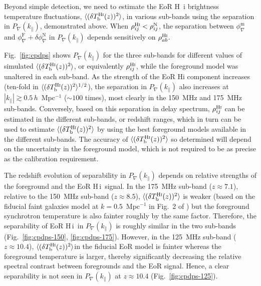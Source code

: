 \documentclass[
reprint,
superscriptaddress,
amsmath,
amssymb,
aps,
prd
]{revtex4-1}
\newcommand{\HI}{H\,{\sc i}}
\begin{document}
Beyond simple detection, we need to estimate the EoR H~{\sc i} brightness temperature fluctuations, $\langle(\delta T_\textrm{b}^\textrm{H{\sc i}}(z))^2\rangle$, in various sub-bands using the separation in $P_\nabla(k_\parallel)$, demonstrated above. When $\rho_{ij}^\textrm{H{\sc i}} < \rho_{ij}^\textrm{N}$, the separation between $\phi_\nabla^\textrm{m}$ and $\phi_\nabla^\textrm{F} + \delta\phi_\nabla^\textrm{N}$ in $P_\nabla(k_\parallel)$ depends sensitively on $\rho_{ab}^\textrm{H{\sc i}}$.

Fig.~\ref{fig:cpdps} shows $P_\nabla(k_\parallel)$ for the three sub-bands for different values of simulated $\langle(\delta T_\textrm{b}^\textrm{H{\sc i}}(z))^2\rangle$, or equivalently $\rho_{ij}^\textrm{H{\sc i}}$, while the foreground model was unaltered in each sub-band. As the strength of the EoR H{\sc i} component increases (ten-fold in $\langle(\delta T_\textrm{b}^\textrm{H{\sc i}}(z))^2\rangle^{1/2}$), the separation in $P_\nabla(k_\parallel)$ also increases at $|k_\parallel| \gtrsim 0.5\,h$~Mpc$^{-1}$ ($\sim 100$ times), most clearly in the 150~MHz and 175~MHz sub-bands. Conversely, based on this separation in delay spectrum, $\rho_{ij}^\textrm{H{\sc i}}$ can be estimated in the different sub-bands, or redshift ranges, which in turn can be used to estimate $\langle(\delta T_\textrm{b}^\textrm{H{\sc i}}(z))^2\rangle$ by using the best foreground models available in the different sub-bands. The accuracy of $\langle(\delta T_\textrm{b}^\textrm{H{\sc i}}(z))^2\rangle$ so determined will depend on the uncertainty in the foreground model, which is not required to be as precise as the calibration requirement.

The redshift evolution of separability in $P_\nabla(k_\parallel)$ depends on relative strengths of the foreground and the EoR \HI\ signal. In the 175~MHz sub-band ($z\approx 7.1$), relative to the 150~MHz sub-band ($z\approx 8.5$), $\langle(\delta T_\textrm{b}^\textrm{H{\sc i}}(z))^2\rangle$ is weaker (based on the fiducial {\sc faint galaxies} model at $k=0.5$~Mpc$^{-1}$ in Fig.~2 of \cite{gre17b}) but the foreground synchrotron temperature is also fainter roughly by the same factor. Therefore, the separability of EoR \HI\ in $P_\nabla(k_\parallel)$ is roughly similar in the two sub-bands (Fig.~\ref{fig:cpdps-150}, \ref{fig:cpdps-175}). However, in the 125~MHz sub-band ($z\approx 10.4$), $\langle(\delta T_\textrm{b}^\textrm{H{\sc i}}(z))^2\rangle$in the fiducial EoR model is fainter whereas the foreground temperature is larger, thereby significantly decreasing the relative spectral contrast between foregrounds and the EoR signal. Hence, a clear separability is not seen in $P_\nabla(k_\parallel)$ at $z\approx 10.4$ (Fig.~\ref{fig:cpdps-125}).
\end{document}
